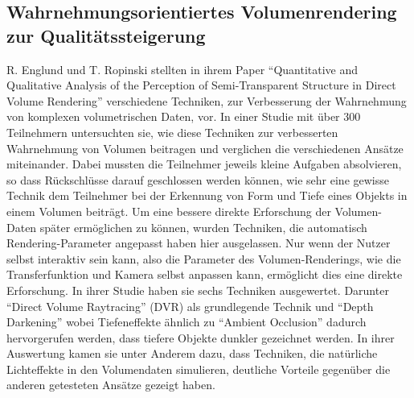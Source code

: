\subsection{Wahrnehmungsorientiertes Volumenrendering zur Qualitätssteigerung}
R. Englund und T. Ropinski stellten in ihrem Paper \enquote{Quantitative and Qualitative Analysis of the Perception of Semi-Transparent Structure in Direct Volume Rendering} \cite{doi:10.1111/cgf.13320} verschiedene Techniken, zur Verbesserung der Wahrnehmung von komplexen volumetrischen Daten, vor.
In einer Studie mit über 300 Teilnehmern untersuchten sie, wie diese Techniken zur verbesserten Wahrnehmung von Volumen beitragen und verglichen die verschiedenen Ansätze miteinander.
Dabei mussten die Teilnehmer jeweils kleine Aufgaben absolvieren, so dass Rückschlüsse darauf geschlossen werden können, wie sehr eine gewisse Technik dem Teilnehmer bei der Erkennung von Form und Tiefe eines Objekts in einem Volumen beiträgt.
Um eine bessere direkte Erforschung der Volumen-Daten später ermöglichen zu können, wurden Techniken, die automatisch Rendering-Parameter angepasst haben hier ausgelassen.
Nur wenn der Nutzer selbst interaktiv sein kann, also die Parameter des Volumen-Renderings, wie die Transferfunktion und Kamera selbst anpassen kann, ermöglicht dies eine direkte Erforschung.
In ihrer Studie haben sie sechs Techniken ausgewertet. Darunter \enquote{Direct Volume Raytracing} (DVR) als grundlegende Technik und \enquote{Depth Darkening} wobei Tiefeneffekte ähnlich zu \enquote{Ambient Occlusion} dadurch hervorgerufen werden, dass tiefere Objekte dunkler gezeichnet werden. 
In ihrer Auswertung kamen sie unter Anderem dazu, dass Techniken, die natürliche Lichteffekte in den Volumendaten simulieren, deutliche Vorteile gegenüber die anderen getesteten Ansätze gezeigt haben.

